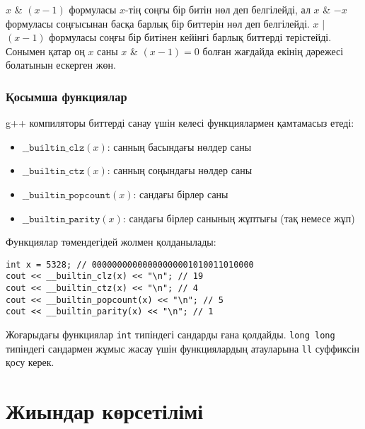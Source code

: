 $x$ \& $(x-1)$ формуласы $x$-тің соңғы бір битін нөл деп белгілейді,
ал $x$ \& $-x$ формуласы соңғысынан басқа барлық бір биттерін нөл 
деп белгілейді. $x$ | $(x-1)$ формуласы соңғы бір битінен кейінгі
барлық биттерді терістейді. Сонымен қатар оң $x$ саны $x$ \& $(x-1) = 0$
болған жағдайда екінің дәрежесі болатынын ескерген жөн.

\subsubsection*{Қосымша функциялар}

g++ компиляторы биттерді санау үшін келесі 
функциялармен қамтамасыз етеді:


\begin{itemize}
\item
$\texttt{\_\_builtin\_clz}(x)$:
санның басындағы нөлдер саны
\item
$\texttt{\_\_builtin\_ctz}(x)$:
санның соңындағы нөлдер саны
\item
$\texttt{\_\_builtin\_popcount}(x)$:
сандағы бірлер саны
\item
$\texttt{\_\_builtin\_parity}(x)$:
сандағы бірлер санының жұптығы (тақ немесе жұп)
\end{itemize}
\begin{samepage}

Функциялар төмендегідей жолмен қолданылады:
\begin{lstlisting}
int x = 5328; // 00000000000000000001010011010000
cout << __builtin_clz(x) << "\n"; // 19
cout << __builtin_ctz(x) << "\n"; // 4
cout << __builtin_popcount(x) << "\n"; // 5
cout << __builtin_parity(x) << "\n"; // 1
\end{lstlisting}
\end{samepage}

Жоғарыдағы функциялар \texttt{int} типіндегі сандарды ғана қолдайды. 
\texttt{long long} типіндегі сандармен жұмыс жасау үшін функциялардың
атауларына \texttt{ll} суффиксін қосу керек. 


\section{Жиындар көрсетілімі}

